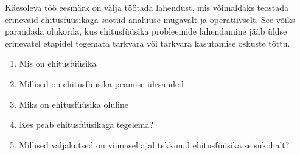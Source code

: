 Käesoleva töö eesmärk on välja töötada lahendust, mis võimaldaks teostada erinevaid ehitusfüüsikaga seotud analüüse mugavalt ja operatiivselt. See võiks parandada olukorda,
kus ehitusfüüsika probleemide lahendamine jääb üldse erinevatel etapidel tegemata tarkvara või tarkvara kasutamise oskuste tõttu.



\begin{enumerate}
    \item Mis on ehitusfüüsika
    \item Millised on ehitusfüüsika peamise ülesanded
    \item Miks on ehitusfüüsika oluline
    \item Kes peab ehitusfüüsikaga tegelema?
    \item Millised väljakutsed on viimasel ajal tekkinud ehitusfüüsika seisukohalt?
\end{enumerate}
